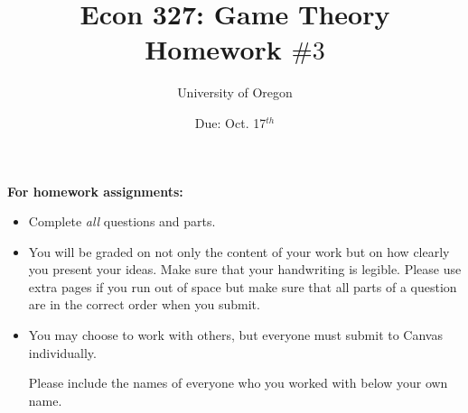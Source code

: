 \documentclass[addpoints]{exam}
\title{
    \textbf{Econ 327: Game Theory} \\ 
    Homework $\#3$
    }
\author{University of Oregon}
\date{Due: Oct. 17$^{th}$}
\begin{document}
\maketitle

\begin{center}
  \gradetable[h][questions]
\end{center}

\vspace{0.5in}

\begin{center}
  \textbf{For homework assignments:}
\end{center}

\begin{itemize}


  \item Complete \textit{all} questions and parts.


  \item You will be graded on not only the content of your work
    but on how clearly you present your ideas.
    Make sure that your handwriting is legible.
    Please use extra pages if you run out of space 
    but make sure that all parts of a question 
    are in the correct order when you submit.

  \item You may choose to work with others,
  but everyone must submit to Canvas individually.

  Please include the names of everyone who you worked with 
  below your own name.
 
\end{itemize}

\vspace{1.0in}


\vspace{0.5in}

\end{document}
